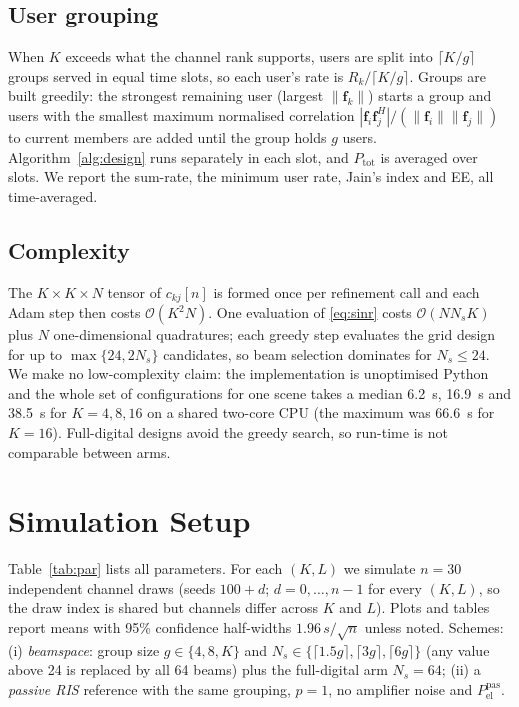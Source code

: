 \documentclass{ieeeaccess}
\begin{document}
\subsection{User grouping}
When $K$ exceeds what the channel rank supports, users are split into $\lceil K/g\rceil$ groups served in equal time slots, so each user's rate is $R_k/\lceil K/g\rceil$. Groups are built greedily: the strongest remaining user (largest $\|\mathbf f_k\|$) starts a group and users with the smallest maximum normalised correlation $|\mathbf f_i\mathbf f_j^H|/(\|\mathbf f_i\|\|\mathbf f_j\|)$ to current members are added until the group holds $g$ users. Algorithm~\ref{alg:design} runs separately in each slot, and $P_\mathrm{tot}$ is averaged over slots. We report the sum-rate, the minimum user rate, Jain's index \cite{jain1984} and EE, all time-averaged.

\subsection{Complexity}
The $K\times K\times N$ tensor of $c_{kj}[n]$ is formed once per refinement call and each Adam step then costs $\mathcal O(K^2N)$. One evaluation of \eqref{eq:sinr} costs $\mathcal O(NN_sK)$ plus $N$ one-dimensional quadratures; each greedy step evaluates the grid design for up to $\max\{24,2N_s\}$ candidates, so beam selection dominates for $N_s\le24$. We make no low-complexity claim: the implementation is unoptimised Python and the whole set of configurations for one scene takes a median 6.2~s, 16.9~s and 38.5~s for $K=4,8,16$ on a shared two-core CPU (the maximum was 66.6~s for $K=16$). Full-digital designs avoid the greedy search, so run-time is not comparable between arms.

\section{Simulation Setup}\label{sec:setup}
Table~\ref{tab:par} lists all parameters. For each $(K,L)$ we simulate $n=30$ independent channel draws (seeds $100+d$; $d=0,\dots,n-1$ for every $(K,L)$, so the draw index is shared but channels differ across $K$ and $L$). Plots and tables report means with 95\% confidence half-widths $1.96\,s/\sqrt n$ unless noted. Schemes: (i) \emph{beamspace}: group size $g\in\{4,8,K\}$ and $N_s\in\{\lceil1.5g\rceil,\lceil3g\rceil,\lceil6g\rceil\}$ (any value above 24 is replaced by all 64 beams) plus the full-digital arm $N_s=64$; (ii) a \emph{passive RIS} reference with the same grouping, $p=1$, no amplifier noise and $P_\mathrm{el}^\mathrm{pas}$.
\end{document}
